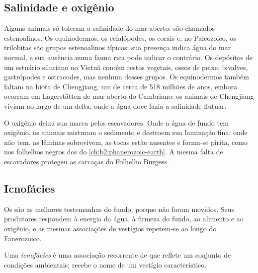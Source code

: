 \subsection*{Salinidade e oxigênio}

Alguns animais só toleram a salinidade do mar aberto: são chamados estenoalinos. Os equinodermos,
os cefalópodes, os corais e, no Paleozoico, os trilobitas são grupos estenoalinos típicos; sua
presença indica água do mar normal, e sua ausência numa fauna rica pode indicar o contrário.
Os depósitos de um estuário siluriano no Vietnã contêm restos vegetais, ossos de peixe, bivalves, gastrópodes
e ostracodes, mas nenhum desses grupos. Os equinodermos também faltam na biota de Chengjiang,
um  de cerca de 518 milhões de anos, embora ocorram em Lagerstätten de mar aberto do
Cambriano: os animais de Chengjiang viviam ao largo de um delta, onde a água doce fazia a salinidade flutuar.

O oxigênio deixa sua marca pelos escavadores. Onde a água de fundo tem oxigênio, os animais misturam o
sedimento e destroem sua laminação fina; onde não tem, as lâminas sobrevivem, as tocas estão
ausentes e forma-se pirita, como nos folhelhos negros dos  do
\cref{ch:b2:phanerozoic-earth}. A mesma falta de escavadores protegeu as carcaças do Folhelho
Burgess.

\subsection*{Icnofácies}

Os  são as melhores testemunhas do fundo, porque não foram movidos. Seus produtores
respondem à energia da água, à firmeza do fundo, ao alimento e ao oxigênio, e as
mesmas associações de vestígios repetem-se ao longo do Fanerozoico.

\begin{definition}[Icnofácies]\label{def:b2:palaeoenvironments:ichnofacies}
Uma \emph{icnofácies} é uma associação recorrente de  que
reflete um conjunto de condições ambientais; recebe o nome de um vestígio característico.
\end{definition}

